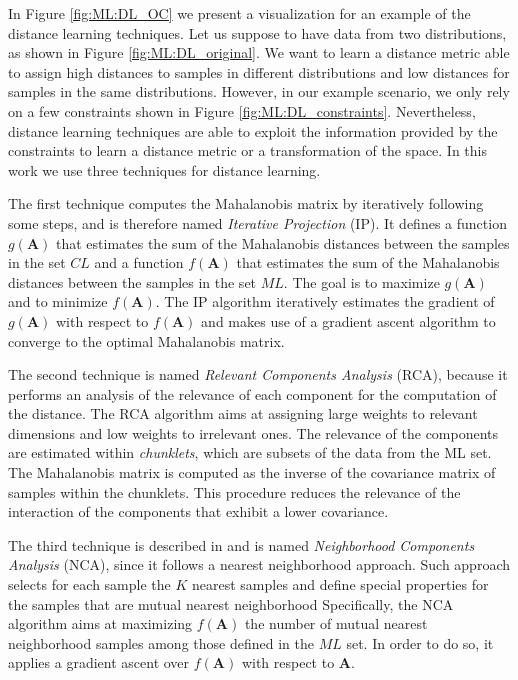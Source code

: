 In Figure \ref{fig:ML:DL_OC} we present a visualization for an example of the distance learning techniques. Let us suppose to have data from two distributions, as shown in Figure \ref{fig:ML:DL_original}. We want to learn a distance metric able to assign high distances to samples in different distributions and low distances for samples in the same distributions. However, in our example scenario, we only rely on a few constraints shown in Figure \ref{fig:ML:DL_constraints}. Nevertheless, distance learning techniques are able to exploit the information provided by the constraints to learn a distance metric or a transformation of the space. In this work we use three techniques for distance learning. 

The first technique computes the Mahalanobis matrix by iteratively following some steps, and is therefore named \textit{Iterative Projection} \cite{xing2003distance} (IP). It defines a function $g(\mathbf{A})$ that estimates the sum of the Mahalanobis distances between the samples in the set $CL$ and a function $f(\mathbf{A})$ that estimates the sum of the Mahalanobis distances between the samples in the set $ML$. The goal is to maximize $g(\mathbf{A})$ and to minimize $f(\mathbf{A})$. The IP algorithm iteratively estimates the gradient of $g(\mathbf{A})$ with respect to $f(\mathbf{A})$ and makes use of a gradient ascent algorithm to converge to the optimal Mahalanobis matrix.

The second technique is named \textit{Relevant Components Analysis}\cite{bar2003learning} (RCA), because it performs an analysis of the relevance of each component for the computation of the distance. The RCA algorithm aims at assigning large weights to relevant dimensions and low weights to irrelevant ones. The relevance of the components are estimated within \textit{chunklets}, which are subsets of the data from the ML set. The Mahalanobis matrix is computed as the inverse of the covariance matrix of samples within the chunklets. This procedure reduces the relevance of the interaction of the components that exhibit a lower covariance.

The third technique is described in \cite{goldberger2004neighbourhood} and is named \textit{Neighborhood Components Analysis} (NCA), since it follows a nearest neighborhood approach. Such approach selects for each sample the $K$ nearest samples and define special properties for the samples that are mutual nearest neighborhood Specifically, the NCA algorithm aims at maximizing $f(\mathbf{A})$ the number of mutual nearest neighborhood samples among those defined in the $ML$ set. In order to do so, it applies a gradient ascent over $f(\mathbf{A})$ with respect to $\mathbf{A}$.

